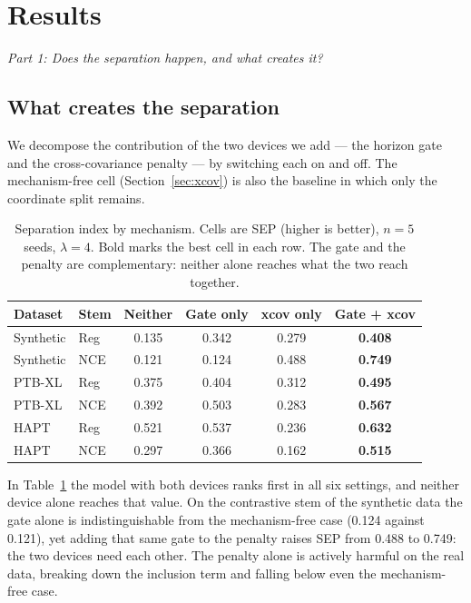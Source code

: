 \section{Results}

\medskip
\noindent\textit{Part 1: Does the separation happen, and what creates it?}

\subsection{What creates the separation}

We decompose the contribution of the two devices we add --- the horizon gate and the cross-covariance penalty --- by switching each on and off. The mechanism-free cell (Section~\ref{sec:xcov}) is also the baseline in which only the coordinate split remains.

\begin{table}[!tbp]
\caption{Separation index by mechanism. Cells are SEP (higher is better), $n=5$ seeds, $\lambda=4$. Bold marks the best cell in each row. The gate and the penalty are complementary: neither alone reaches what the two reach together.}
\label{tab:ablation}
\centering
\small
\begin{tabular}{llcccc}
\hline
Dataset & Stem & Neither & Gate only & xcov only & \textbf{Gate + xcov} \\
\hline
Synthetic & Reg & 0.135 & 0.342 & 0.279 & \textbf{0.408} \\
Synthetic & NCE & 0.121 & 0.124 & 0.488 & \textbf{0.749} \\
PTB-XL & Reg & 0.375 & 0.404 & 0.312 & \textbf{0.495} \\
PTB-XL & NCE & 0.392 & 0.503 & 0.283 & \textbf{0.567} \\
HAPT & Reg & 0.521 & 0.537 & 0.236 & \textbf{0.632} \\
HAPT & NCE & 0.297 & 0.366 & 0.162 & \textbf{0.515} \\
\hline
\end{tabular}
\end{table}

In Table~\ref{tab:ablation} the model with both devices ranks first in all six settings, and neither device alone reaches that value. On the contrastive stem of the synthetic data the gate alone is indistinguishable from the mechanism-free case (0.124 against 0.121), yet adding that same gate to the penalty raises SEP from 0.488 to 0.749: the two devices need each other. The penalty alone is actively harmful on the real data, breaking down the inclusion term and falling below even the mechanism-free case.

